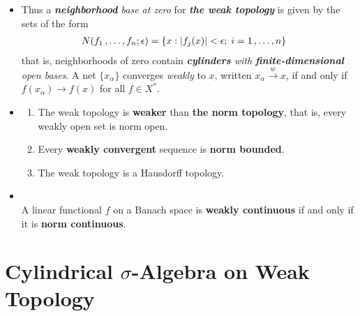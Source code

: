 \documentclass[11pt]{article}
\begin{document}
\begin{itemize}
\item \begin{remark}
Thus a \emph{\textbf{neighborhood} base at zero} for \emph{\textbf{the weak topology}} is given by the sets
of the form
\begin{align*}
N(f_1 \,{,}\ldots{,}\, f_n; \epsilon) &= \left\{x: \left\lvert f_{j}(x) \right\rvert <\epsilon; \; i= 1 \,{,}\ldots{,}\, n\right\}
\end{align*}
that is, neighborhoods of zero contain \emph{\textbf{cylinders} with \textbf{finite-dimensional} open bases}. A net $\{x_{\alpha}\}$ converges \emph{weakly} to $x$, written $x_\alpha \stackrel{w}{\rightarrow} x$, if and only if $f(x_{\alpha}) \rightarrow f(x)$ for all $f \in X^{*}$.
\end{remark}



\item \begin{proposition} \citep{reed1980methods}
\begin{enumerate}
\item The weak topology is \textbf{weaker} than \textbf{the norm topology}, that is, every weakly open set is norm open.
\item Every \textbf{weakly convergent} sequence is \textbf{norm bounded}.
\item The weak topology is a Hausdorff topology.
\end{enumerate}
\end{proposition}

\item \begin{proposition} \citep{reed1980methods}\\
A linear functional $f$ on a Banach space is \textbf{weakly continuous} if and only if it is \textbf{norm continuous}.
\end{proposition}
\end{itemize}


\section{Cylindrical $\sigma$-Algebra on Weak Topology}
\end{document}
